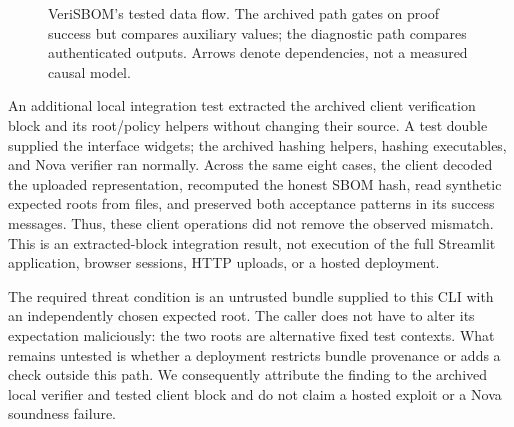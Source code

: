 \documentclass[sigconf,nonacm]{acmart}
\begin{document}
\begin{figure}[t]
\centering
{}
\caption{VeriSBOM's tested data flow. The archived path gates on proof success but compares auxiliary values; the diagnostic path compares authenticated outputs. Arrows denote dependencies, not a measured causal model.}
\label{fig:flow}
\end{figure}

An additional local integration test extracted the archived client verification block and its root/policy helpers without changing their source. A test double supplied the interface widgets; the archived hashing helpers, hashing executables, and Nova verifier ran normally. Across the same eight cases, the client decoded the uploaded representation, recomputed the honest SBOM hash, read synthetic expected roots from files, and preserved both acceptance patterns in its success messages. Thus, these client operations did not remove the observed mismatch. This is an extracted-block integration result, not execution of the full Streamlit application, browser sessions, HTTP uploads, or a hosted deployment.

The required threat condition is an untrusted bundle supplied to this CLI with an independently chosen expected root. The caller does not have to alter its expectation maliciously: the two roots are alternative fixed test contexts. What remains untested is whether a deployment restricts bundle provenance or adds a check outside this path. We consequently attribute the finding to the archived local verifier and tested client block and do not claim a hosted exploit or a Nova soundness failure.
\end{document}
